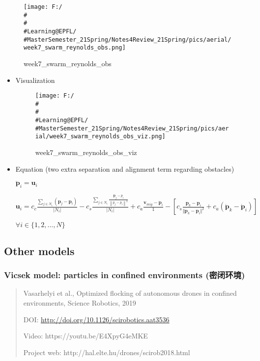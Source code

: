 \documentclass[]{article}
\begin{document}
\begin{figure}
\centering
\texttt{[image: F:/\\\#\\\#\\\#Learning@EPFL/\\\#MasterSemester\_21Spring/Notes4Review\_21Spring/pics/aerial/week7\_swarm\_reynolds\_obs.png]}
\caption{week7\_swarm\_reynolds\_obs}
\end{figure}

\begin{itemize}
\item
  Visualization

  \begin{figure}
  \centering
  \texttt{[image: F:/\\\#\\\#\\\#Learning@EPFL/\\\#MasterSemester\_21Spring/Notes4Review\_21Spring/pics/aerial/week7\_swarm\_reynolds\_obs\_viz.png]}
  \caption{week7\_swarm\_reynolds\_obs\_viz}
  \end{figure}
\item
  Equation (two extra separation and alignment term regarding obstacles)

  \(\ddot{\mathbf{p}}_{i}=\mathbf{u}_{i}\)

  \(\mathbf{u}_{i}=c_{c} \frac{\sum_{j \in N_{i}}\left(\mathbf{p}_{j}-\mathbf{p}_{i}\right)}{\left|N_{i}\right|}-c_{s} \frac{\sum_{j \in N_{i}} \frac{\mathbf{p}_{j}-p_{i}}{\left\|p_{j}-p_{i}\right\|^{2}}}{\left|N_{i}\right|}+c_a \frac{\mathbf{v}_{mig}-\dot{\mathbf{p}}_i}{1} -\left[c_s \frac{\mathbf{p}_k - \mathbf{p}_i}{\Vert \mathbf{p}_k - \mathbf{p}_i \Vert^2} + c_a (\dot{\mathbf{p}}_k - \dot{\mathbf{p}}_i)\right]\)

  \(\forall i \in\{1,2, \ldots, N\}\)
\end{itemize}

\subsection{Other models}\label{header-n1359}

\subsubsection{Vicsek model: particles in confined environments
(密闭环境)}\label{header-n1360}

\begin{quote}
Vasarhelyi et al., Optimized flocking of autonomous drones in confined
environments, Science Robotics, 2019

DOI: \url{http://doi.org/10.1126/scirobotics.aat3536}

Video: https://youtu.be/E4XpyG4eMKE

Project web: http://hal.elte.hu/drones/scirob2018.html
\end{quote}
\end{document}
